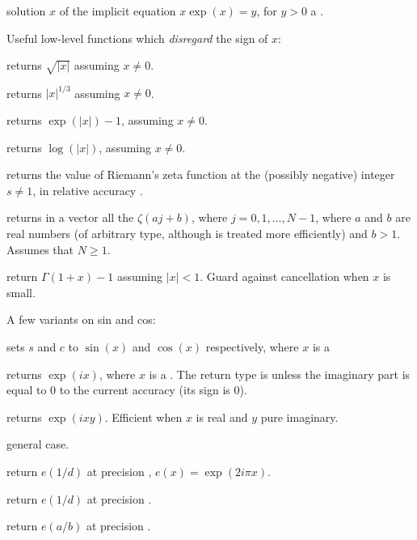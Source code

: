  solution $x$ of the implicit equation
$x \exp(x) = y$, for $y > 0$ a .

\noindent Useful low-level functions which \emph{disregard} the sign of $x$:

 returns $\sqrt{|x|}$ assuming $x\neq 0$.

 returns $|x|^{1/3}$ assuming $x\neq 0$.

 returns $\exp(|x|) - 1$, assuming $x \neq 0$.

 returns $\log(|x|)$, assuming $x \neq 0$.


 returns the value of Riemann's zeta
function at the (possibly negative) integer $s\neq 1$, in relative accuracy
.

 returns in a vector
all the $\zeta(aj + b)$, where $j = 0, 1, \dots, N-1$, where $a$ and $b$ are
real numbers (of arbitrary type, although  is treated more
efficiently) and $b > 1$. Assumes that $N \geq 1$.

 return $\Gamma(1+x) - 1$ assuming
$|x| < 1$. Guard against cancellation when $x$ is small.

\noindent A few variants on sin and cos:

 sets $s$ and $c$ to
$\sin(x)$ and $\cos(x)$ respectively, where $x$ is a 

 returns $\exp(ix)$, where $x$ is a .
The return type is  unless the imaginary part is equal to $0$
to the current accuracy (its sign is $0$).

 returns $\exp(ixy)$. Efficient
when $x$ is real and $y$ pure imaginary.

 general case.

 return $e(1/d)$ at precision
, $e(x) = \exp(2i\pi x)$.

 return $e(1/d)$ at
precision .

 return $e(a/b)$ at
precision .

